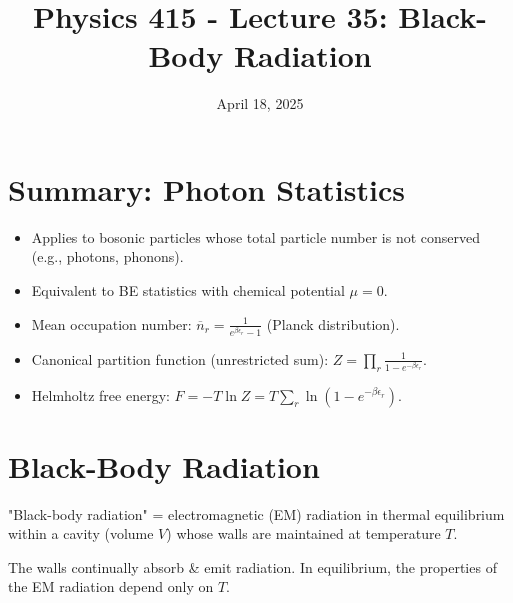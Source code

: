 \documentclass[11pt]{article}
\title{Physics 415 - Lecture 35: Black-Body Radiation}
\date{April 18, 2025}
\author{} %
\newcommand{\eps}{\epsilon}
\newcommand{\nbar}{\overline{n}} %
\begin{document}
\maketitle
\thispagestyle{empty}

\section*{Summary: Photon Statistics}

\begin{itemize}
    \item Applies to bosonic particles whose total particle number is not conserved (e.g., photons, phonons).
    \item Equivalent to BE statistics with chemical potential $\mu=0$.
    \item Mean occupation number: $\nbar_r = \frac{1}{e^{\beta\eps_r} - 1}$ (Planck distribution).
    \item Canonical partition function (unrestricted sum): $Z = \prod_r \frac{1}{1-e^{-\beta\eps_r}}$.
    \item Helmholtz free energy: $F = -T \ln Z = T \sum_r \ln(1 - e^{-\beta\eps_r})$.
\end{itemize}

\section*{Black-Body Radiation}

"Black-body radiation" = electromagnetic (EM) radiation in thermal equilibrium within a cavity (volume $V$) whose walls are maintained at temperature $T$.
\begin{center}
\end{center}
The walls continually absorb \& emit radiation. In equilibrium, the properties of the EM radiation depend only on $T$.
\end{document}
